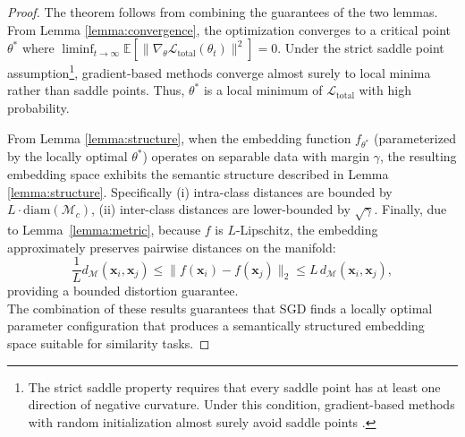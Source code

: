 \documentclass[a4paper,12pt,reqno]{amsart}
\theoremstyle{definition}
\theoremstyle{remark}
\begin{document}
\begin{proof}
	The theorem follows from combining the guarantees of the two lemmas. From Lemma \ref{lemma:convergence}, the optimization converges to a critical point $\theta^*$ where  $\liminf_{t\to\infty} \mathbb{E}[\|\nabla_{\theta} \mathcal{L}_{\text{total}}(\theta_t)\|^2] = 0$. Under the strict saddle point assumption\footnote{The strict saddle property requires that every saddle point has at least one direction of negative curvature. Under this condition, gradient-based methods with random initialization almost surely avoid saddle points \cite{lee2016gradient}.}, gradient-based methods converge almost surely to local minima rather than saddle points. Thus, $\theta^*$ is a local minimum of $\mathcal{L}_{\text{total}}$ with high probability.
	
	From Lemma \ref{lemma:structure}, when the embedding function $f_{\theta^*}$ (parameterized by the locally optimal $\theta^*$) operates on separable data with margin $\gamma$, the resulting embedding space exhibits the semantic structure described in Lemma \ref{lemma:structure}. Specifically (i) intra-class distances are bounded by $L \cdot \text{diam}(\mathcal{M}_c)$, (ii)  inter-class distances are lower-bounded by $\sqrt{\gamma}$. Finally, due to Lemma~\ref{lemma:metric}, because $f$ is $L$-Lipschitz, the embedding approximately preserves pairwise distances on the manifold:
		\[
		\frac{1}{L} d_\mathcal{M}(\mathbf{x}_i, \mathbf{x}_j) \le \|f(\mathbf{x}_i) - f(\mathbf{x}_j)\|_2 \le L \, d_\mathcal{M}(\mathbf{x}_i, \mathbf{x}_j),
		\]
		providing a bounded distortion guarantee.\\
	The combination of these results guarantees that SGD finds a locally optimal parameter configuration that produces a semantically structured embedding space suitable for similarity tasks.
\end{proof}
\end{document}
